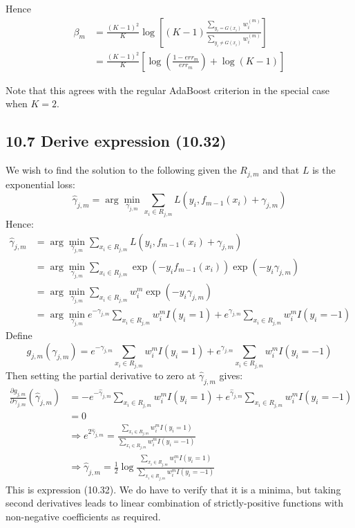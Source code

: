 Hence
\begin{align*}
    \beta_m &= \frac{\left(K-1\right)^2}{K} \log\left[(K-1)\frac{\sum_{y_i = G(x_i)} w_i^{(m)}}{\sum_{y_i \neq G(x_i)} w_i^{(m)}}\right] \\
    &= \frac{\left(K-1\right)^2}{K} \left[\log\left(\frac{1 - err_m}{err_m}\right) + \log (K-1) \right]
\end{align*} 

Note that this agrees with the regular AdaBoost criterion in the special case when $K = 2$.

\subsection*{10.7 Derive expression (10.32)}

We wish to find the solution to the following given the $R_{j,m}$ and that $L$ is the exponential loss:
$$\hat{\gamma}_{j,m} = \arg\min_{\gamma_{j,m}} \sum_{x_i \in R_{j,m}} L\left(y_i, f_{m-1}(x_i) + \gamma_{j,m} \right)$$
Hence:
\begin{align*}
    \hat{\gamma}_{j,m} &= \arg\min_{\gamma_{j,m}} \sum_{x_i \in R_{j,m}} L\left(y_i, f_{m-1}(x_i) + \gamma_{j,m} \right) \\
    &= \arg\min_{\gamma_{j,m}} \sum_{x_i \in R_{j,m}} \exp\left(-y_i f_{m-1}(x_i)\right) \exp\left(-y_i \gamma_{j,m} \right) \\
    &= \arg\min_{\gamma_{j,m}} \sum_{x_i \in R_{j,m}} w_i^{m} \exp\left(-y_i \gamma_{j,m} \right) \\
    &= \arg\min_{\gamma_{j,m}}  e^{-\gamma_{j,m} } \sum_{x_i \in R_{j,m}} w_i^{m} I(y_i = 1) + e^{\gamma_{j,m} } \sum_{x_i \in R_{j,m}} w_i^{m} I(y_i = -1)
\end{align*}
Define
$$ g_{j,m}(\gamma_{j,m}) = e^{-\gamma_{j,m} } \sum_{x_i \in R_{j,m}} w_i^{m} I(y_i = 1) + e^{\gamma_{j,m} } \sum_{x_i \in R_{j,m}} w_i^{m} I(y_i = -1)$$
Then setting the partial derivative to zero at $\hat{\gamma}_{j,m}$ gives:
\begin{align*}
    \frac{\partial g_{j,m}}{\partial \gamma_{j,m}}(\hat{\gamma}_{j,m}) &=  -e^{-\hat{\gamma}_{j,m} } \sum_{x_i \in R_{j,m}} w_i^{m} I(y_i = 1) + e^{\hat{\gamma}_{j,m}} \sum_{x_i \in R_{j,m}} w_i^{m} I(y_i = -1)\\ 
    &= 0\\
   &\Rightarrow e^{2\hat{\gamma}_{j,m}} = \frac{\sum_{x_i \in R_{j,m}} w_i^{m} I(y_i = 1)}{\sum_{x_i \in R_{j,m}} w_i^{m} I(y_i = -1)} \\ 
   &\Rightarrow \hat{\gamma}_{j,m} = \frac{1}{2}\log\frac{\sum_{x_i \in R_{j,m}} w_i^{m} I(y_i = 1)}{\sum_{x_i \in R_{j,m}} w_i^{m} I(y_i = -1)} 
\end{align*}
This is expression (10.32).
We do have to verify that it is a minima, but taking second derivatives leads to linear combination of strictly-positive functions with non-negative coefficients as required.

